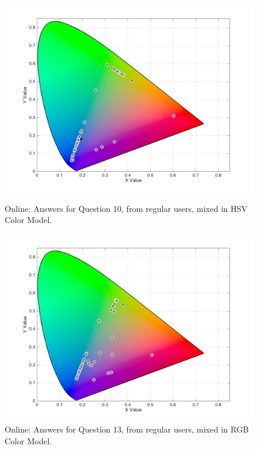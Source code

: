 \begin{figure}[htbp]
  \centering
  \vspace{-15pt}
  \begin{minipage}{0.48\textwidth}
    \centering
    \includegraphics[width=\textwidth]{images/results/10_online_HSVresponses.png}
    \caption[Online: Answers for Question 10, from regular users, mixed in HSV Color Model.]{Online: Answers for Question 10, from regular users, mixed in HSV Color Model.}
    \label{fig:onlinehsvregular_10}
  \end{minipage}\hfill
  \begin{minipage}{0.48\textwidth}
    \centering
    \includegraphics[width=\textwidth]{images/results/13_online_RGBresponses.png}
    \caption[Online: Answers for Question 13, from regular users, mixed in RGB Color Model.]{Online: Answers for Question 13, from regular users, mixed in RGB Color Model.}
    \label{fig:onlinehsvregular_13}
  \end{minipage}
  \vspace{-5pt}
\end{figure}
%
